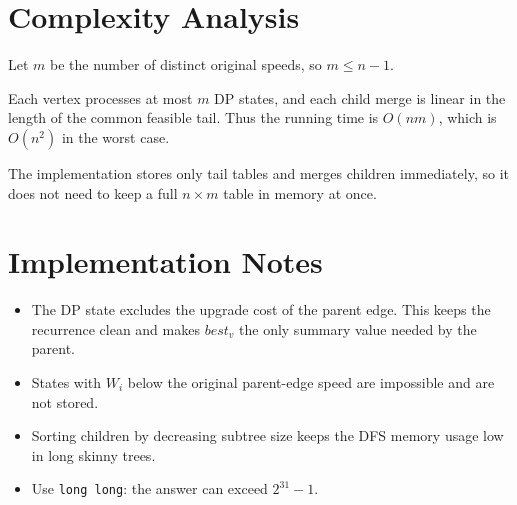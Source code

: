 \documentclass[11pt]{article}
\begin{document}
\section*{Complexity Analysis}

Let $m$ be the number of distinct original speeds, so $m \le n-1$.

Each vertex processes at most $m$ DP states, and each child merge is linear in the length of the common feasible tail.
Thus the running time is $O(nm)$, which is $O(n^2)$ in the worst case.

The implementation stores only tail tables and merges children immediately, so it does not need to keep a full
$n \times m$ table in memory at once.

\section*{Implementation Notes}

\begin{itemize}[leftmargin=*]
    \item The DP state excludes the upgrade cost of the parent edge. This keeps the recurrence clean and makes
    $best_v$ the only summary value needed by the parent.
    \item States with $W_i$ below the original parent-edge speed are impossible and are not stored.
    \item Sorting children by decreasing subtree size keeps the DFS memory usage low in long skinny trees.
    \item Use \texttt{long long}: the answer can exceed $2^{31}-1$.
\end{itemize}
\end{document}
